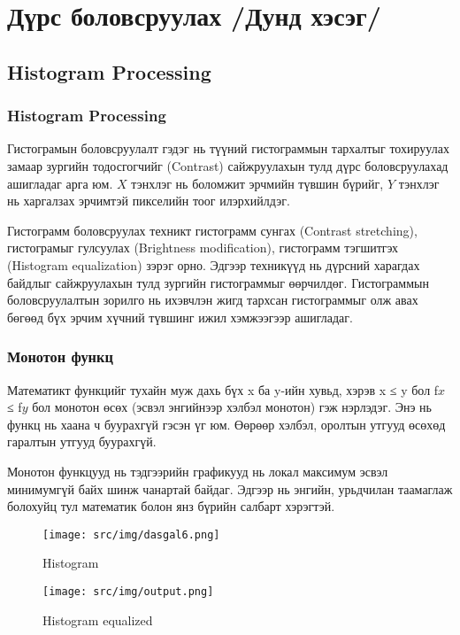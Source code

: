 \chapter{Дүрс боловсруулах /Дунд хэсэг/}

\section{Histogram Processing}
\subsection{Histogram Processing}
Гистограмын боловсруулалт гэдэг нь түүний гистограммын тархалтыг тохируулах замаар
зургийн тодосгогчийг (Contrast) сайжруулахын тулд дүрс боловсруулахад ашигладаг арга юм.
\textbf{\(X\)} тэнхлэг нь боломжит эрчмийн түвшин бүрийг, \textbf{\(Y\)} тэнхлэг
нь харгалзах эрчимтэй пикселийн тоог илэрхийлдэг.

Гистограмм боловсруулах техникт гистограмм сунгах (Contrast stretching),
гистограмыг гулсуулах (Brightness modification), гистограмм тэгшитгэх (Histogram equalization)
зэрэг орно. Эдгээр техникүүд нь дүрсний харагдах байдлыг
сайжруулахын тулд зургийн гистограммыг өөрчилдөг. Гистограммын
боловсруулалтын зорилго нь ихэвчлэн жигд тархсан гистограммыг олж авах бөгөөд бүх
эрчим хүчний түвшинг ижил хэмжээгээр ашигладаг\cite{histogram}.

\subsection{Монотон функц}
Математикт функцийг тухайн муж дахь бүх x ба y-ийн хувьд, хэрэв
x ≤ y бол f\(x\) ≤ f\(y\) бол монотон өсөх (эсвэл энгийнээр хэлбэл монотон) гэж
нэрлэдэг. Энэ нь функц нь хаана ч буурахгүй гэсэн үг юм. Өөрөөр хэлбэл,
оролтын утгууд өсөхөд гаралтын утгууд буурахгүй.

Монотон функцууд нь тэдгээрийн графикууд нь локал
максимум эсвэл минимумгүй байх шинж чанартай байдаг. Эдгээр
нь энгийн, урьдчилан таамаглаж болохуйц тул математик
болон янз бүрийн салбарт хэрэгтэй\cite{monoton}.

\begin{figure}[h!]
    \centering
    \texttt{[image: src/img/dasgal6.png]}
    \caption{Histogram}
\end{figure}
\begin{figure}[h!]
    \centering
    \texttt{[image: src/img/output.png]}
    \caption{Histogram equalized}
\end{figure}